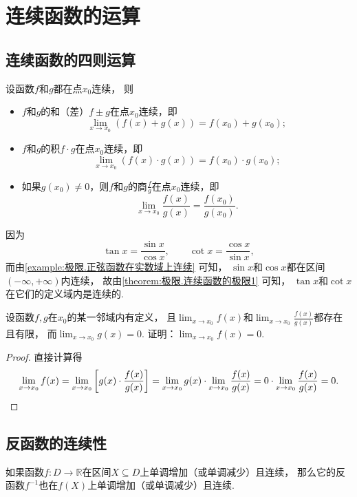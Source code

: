 \section{连续函数的运算}
\subsection{连续函数的四则运算}
\begin{theorem}\label{theorem:极限.连续函数的极限1}
设函数\(f\)和\(g\)都在点\(x_0\)连续，
则\begin{itemize}
	\item \(f\)和\(g\)的和（差）\(f \pm g\)在点\(x_0\)连续，即\[
		\lim_{x \to x_0} (f(x) + g(x))
		= f(x_0) + g(x_0);
	\]
	\item \(f\)和\(g\)的积\(f \cdot g\)在点\(x_0\)连续，即\[
		\lim_{x \to x_0} (f(x) \cdot g(x))
		= f(x_0) \cdot g(x_0);
	\]
	\item 如果\(g(x_0)\neq0\)，则\(f\)和\(g\)的商\(\frac{f}{g}\)在点\(x_0\)连续，即\[
		\lim_{x \to x_0} \frac{f(x)}{g(x)}
		= \frac{f(x_0)}{g(x_0)}.
	\]
\end{itemize}
\end{theorem}

\begin{example}
因为\[
	\tan x=\frac{\sin x}{\cos x}, \qquad
	\cot x=\frac{\cos x}{\sin x},
\]
而由\cref{example:极限.正弦函数在实数域上连续} 可知，
\(\sin x\)和\(\cos x\)都在区间\((-\infty,+\infty)\)内连续，
故由\cref{theorem:极限.连续函数的极限1} 可知，
\(\tan x\)和\(\cot x\)在它们的定义域内是连续的.
\end{example}

\begin{example}
设函数\(f,g\)在\(x_0\)的某一邻域内有定义，
且\(\lim_{x\to x_0}f(x)\)和\(\lim_{x\to x_0}\frac{f(x)}{g(x)}\)都存在且有限，
而\(\lim_{x\to x_0}g(x)=0\).
证明：\(\lim_{x\to x_0}f(x)=0\).
\begin{proof}
直接计算得\[
	\lim_{x\to x_0}f(x)
	= \lim_{x\to x_0}\left[
		g(x) \cdot \frac{f(x)}{g(x)}
	\right]
	= \lim_{x\to x_0}g(x) \cdot \lim_{x\to x_0}\frac{f(x)}{g(x)}
	= 0 \cdot \lim_{x\to x_0}\frac{f(x)}{g(x)} = 0.
	\qedhere
\]
\end{proof}
\end{example}

\subsection{反函数的连续性}
\begin{theorem}\label{theorem:极限.连续函数的极限2}
如果函数\(f\colon D\to\mathbb{R}\)在区间\(X\subseteq D\)上单调增加（或单调减少）且连续，
那么它的反函数\(f^{-1}\)也在\(f(X)\)上单调增加（或单调减少）且连续.
\end{theorem}

